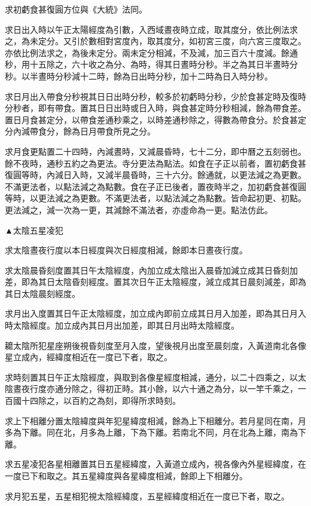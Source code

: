 求初虧食甚復圓方位與《大統》法同。

求日出入時以午正太陽經度為引數，入西域晝夜時立成，取其度分，依比例法求之，為未定分。又引於數相對宮度內，取其度分，如初宮三度，向六宮三度取之。亦依比例法求之，為後未定分。兩未定分相減，不及減，加三百六十度減。餘通秒，用十五除之，六十收之為分、為時，得其日晝時分秒。半之為其日半晝時分秒。以半晝時分秒減十二時，餘為日出時分秒，加十二時為日入時分秒。

求日月出入帶食分秒視其日日出時分秒，較多於初虧時分秒，少於食甚定時及復時分秒者，即有帶食。置其日日出時或日入時，與食甚定時分秒相減，餘為帶食差。置日月食甚定分，以帶食差通秒乘之，以時差通秒除之，得數為帶食分。於食甚定分內減帶食分，餘為日月帶食所見之分。

求月食更點置二十四時，內減晝時，又減晨昏時，七十二分，即中曆之五刻弱也。餘不夜時，通秒五約之為更法。寺分更法為點法。如食在子正以前者，置初虧食甚復圓等時，內減日入時，又減半晨昏時，三十六分。餘通就，以更法減之為更數。不滿更法者，以點法減之為點數。食在子正已後者，置夜時半之，加初虧食甚復圓等時，以更法減之為更數。不滿更法者，以點法減之為點數。皆命起初更、初點。更法減之，減一次為一更，其減餘不滿法者，亦虛命為一更。點法仿此。

▲太陰五星凌犯

求太陰晝夜行度以本日經度與次日經度相減，餘即本日晝夜行度。

求太陰晨昏刻度置其日午太陰經度，內加立成太陰出入晨昏加減立成其日昏刻加差，即為其日太陰昏刻經度。置其次日午正太陰經度，減立成其日晨刻減差，即為其日太陰晨刻經度。

求月出入度置其日午正太陰經度，加立成內即前立成其日月入加差，即為其日月入時太陰經度。加立成內其日月出加差，即其日月出時太陰經度。

耱太陰所犯星座朔後視昏刻度至月入度，望後視月出度至晨刻度，入黃道南北各像星立成內，經緯度相近在一度已下者，取之。

求時刻置其日午正太陰經度，與取到各像星經度相減，通分，以二十四乘之，以太陰晝夜行度亦通分除之，得初正時。其小餘，以六十通之為分，以一竿千乘之，一百國十四除之，以百約之為刻，即得所求時刻。

求上下相離分置太陰緯度與年犯星緯度相減，餘為上下相離分。若月星同在南，月多為下離。同在北，月多為上離，下為下離。若南北不同，月在北為上離，南為下離。

求五星凌犯各星相離置其日五星經緯度，入黃道立成內，視各像內外星經緯度，在一度已下和取之。其五星緯度與各星緯度相減，餘即上下相離分。

求月犯五星，五星相犯視太陰經緯度，五星經緯度相近在一度已下者，取之。

